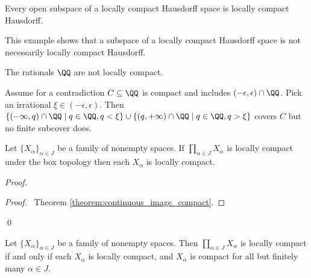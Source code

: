 \begin{corollary}
    Every open subspace of a locally compact Hausdorff space is locally compact Hausdorff.
\end{corollary}

This example shows that a subspace of a locally compact Hausdorff space is not necessarily locally
compact Hausdorff.

\begin{example}
    The rationals $\QQ$ are not locally compact.

    Assume for a contradiction $C \subseteq \QQ$ is compact and includes $(-\epsilon, \epsilon)
    \cap \QQ$. Pick an irrational $\xi \in (- \epsilon, \epsilon)$. Then $\{ (-\infty, q) \cap
    \QQ \mid q \in \QQ, q < \xi \} \cup \{ (q, +\infty) \cap
    \QQ \mid q \in \QQ, q > \xi \}$ covers $C$ but no finite subcover does.
\end{example}

\begin{proposition}
    Let $\{ X_\alpha \}_{\alpha \in J}$ be a family of nonempty spaces. If
    $\prod_{\alpha \in J} X_\alpha$ is locally compact under the box topology then each $X_\alpha$ is
    locally compact.
\end{proposition}

\begin{proof}
    \pf
    \begin{proof}
        \pf\ Theorem \ref{theorem:continuous_image_compact}.
    \end{proof}
    \qed
\end{proof}

\begin{proposition}[AC]
    Let $\{ X_\alpha \}_{\alpha \in J}$ be a family of nonempty spaces. Then
    $\prod_{\alpha \in J} X_\alpha$ is locally compact if and only if each $X_\alpha$ is locally compact,
    and $X_\alpha$ is compact for all but finitely many $\alpha \in J$.
\end{proposition}

